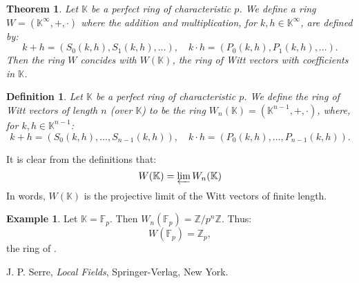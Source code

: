 \documentclass[12pt]{article}
\newtheorem{thm}{Theorem}
\newtheorem{defn}{Definition}
\theoremstyle{definition}
\newtheorem{exa}{Example}
\newcommand{\Ints}{\mathbb{Z}}
\begin{document}
\begin{thm}
Let $\mathbb{K}$ be a perfect ring of characteristic $p$. We define a ring $W=(\mathbb{K}^\infty,+,\cdot)$ where the addition and multiplication, for $k,h \in \mathbb{K}^\infty$, are defined by:
$$k+h=(S_0(k,h),S_1(k,h),\ldots),\quad k\cdot h =(P_0(k,h),P_1(k,h),\ldots).$$
Then the ring $W$ concides with $W(\mathbb{K})$, the ring of Witt vectors with coefficients in $\mathbb{K}$.
\end{thm}

\begin{defn}
Let $\mathbb{K}$ be a perfect ring of characteristic $p$. We define the ring of Witt vectors of length $n$ (over $\mathbb{K}$) to be the ring $W_n(\mathbb{K})=(\mathbb{K}^{n-1},+,\cdot)$, where, for $k,h \in \mathbb{K}^{n-1}$:
$$ k+h=(S_0(k,h),\ldots,S_{n-1}(k,h)),\quad k\cdot h=(P_0(k,h),\ldots,P_{n-1}(k,h)).$$
\end{defn}

It is clear from the definitions that:
$$W(\mathbb{K})=\varprojlim W_n(\mathbb{K})$$
In words, $W(\mathbb{K})$ is the projective limit of the Witt vectors of finite length.

\begin{exa}
Let $\mathbb{K}=\mathbb{F}_p$. Then $W_n(\mathbb{F}_p)=\Ints/p^n\Ints$. Thus:
$$W(\mathbb{F}_p)=\Ints_p,$$
the ring of .
\end{exa}
\begin{thebibliography}{9}
 J. P. Serre, {\em Local Fields},
Springer-Verlag, New York.
\end{thebibliography}
\end{document}
